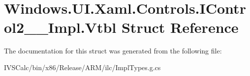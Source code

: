\hypertarget{struct_windows_1_1_u_i_1_1_xaml_1_1_controls_1_1_i_control2_____impl_1_1_vtbl}{}\section{Windows.\+U\+I.\+Xaml.\+Controls.\+I\+Control2\+\_\+\+\_\+\+Impl.\+Vtbl Struct Reference}
\label{struct_windows_1_1_u_i_1_1_xaml_1_1_controls_1_1_i_control2_____impl_1_1_vtbl}


The documentation for this struct was generated from the following file\+:\begin{DoxyCompactItemize}
\item 
I\+V\+S\+Calc/bin/x86/\+Release/\+A\+R\+M/ilc/Impl\+Types.\+g.\+cs\end{DoxyCompactItemize}
